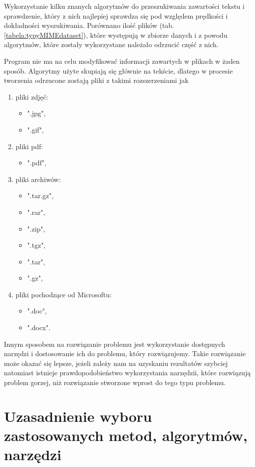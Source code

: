 Wykorzystanie kilku znanych algorytmów do przeszukiwania zawartości
tekstu i sprawdzenie, który z nich najlepiej sprawdza się pod względem prędkości
i dokładności wyszukiwania. Porównano ilość plików (tab. \ref{tabela:typyMIMEdataset}),
które występują w zbiorze danych i z powodu algorytmów, które zostały 
wykorzystane należało odrzucić część z nich.

Program nie ma na celu modyfikować informacji zawartych w plikach w żaden sposób.
Algorytmy użyte skupiają się głównie na tekście, dlatego w procesie tworzenia 
odrzucone zostają pliki z takimi rozszerzeniami jak
\begin{enumerate}
  \item pliki zdjęć:
  \begin{itemize}
    \item ".jpg",  
    \item ".gif",
  \end{itemize}
  \item pliki pdf:
  \begin{itemize}
    \item ".pdf",
  \end{itemize}
  \item pliki archiwów:
  \begin{itemize}
    \item ".tar.gz",
    \item ".rar", 
    \item ".zip",
    \item ".tgz",
    \item ".tar",
    \item ".gz",
  \end{itemize}
  \item pliki pochodzące od Microsoftu:
  \begin{itemize}
    \item ".doc", 
    \item ".docx".
  \end{itemize}
\end{enumerate}

Innym sposobem na rozwiązanie problemu jest wykorzystanie dostępnych narzędzi i
dostosowanie ich do problemu, który rozwiązujemy. Takie rozwiązanie może okazać
się lepsze, jeżeli zależy nam na uzyskaniu rezultatów szybciej natomiast istnieje 
prawdopodobieństwo wykorzystania narzędzii, które rozwiązują problem gorzej,
niż rozwiązanie stworzone wprost do tego typu problemu.

\section{Uzasadnienie wyboru zastosowanych metod, algorytmów, narzędzi}

